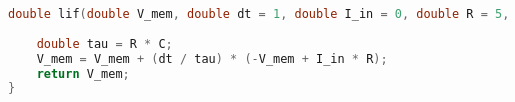 \begin{lstlisting}[language=C++, caption={Implementação em C++ da decaimento do potencial de ação de um LIF: $I_{in} = 0$}, label={lst:membranepotentialdecay}]
double lif(double V_mem, double dt = 1, double I_in = 0, double R = 5, double C = 1) {
	
	double tau = R * C;
	V_mem = V_mem + (dt / tau) * (-V_mem + I_in * R);
	return V_mem;
}
\end{lstlisting}